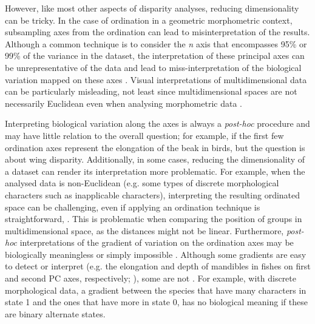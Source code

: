 \documentclass[12pt,letterpaper]{article}
\begin{document}
However, like most other aspects of disparity analyses, reducing dimensionality can be tricky.
In the case of ordination in a geometric morphometric context, subsampling axes from the ordination can lead to misinterpretation of the results. 
Although a common technique is to consider the \textit{n} axis that encompasses 95\% or 99\% of the variance in the dataset, the interpretation of these principal axes can be unrepresentative of the data and lead to miss-interpretation of the biological variation mapped on these axes \citep{Bookstein2015-yy, Bookstein2017-qk, Bookstein2017-gu,Weisbecker2019-kp}.
Visual interpretations of multidimensional data can be particularly misleading, not least since multidimensional spaces are not necessarily Euclidean even when analysing morphometric data \citep{Deline2018-le, Gerber2017-xi}.

Interpreting biological variation along the axes is always a \textit{post-hoc} procedure and may have little relation to the overall question; for example, if the first few ordination axes represent the elongation of the beak in birds, but the question is about wing disparity.
Additionally, in some cases, reducing the dimensionality of a dataset can render its interpretation more problematic.
For example, when the analysed data is non-Euclidean (e.g. some types of discrete morphological characters such as inapplicable characters), interpreting the resulting ordinated space can be challenging, even if applying an ordination technique is straightforward, \citep{Gerber2019}.
This is problematic when comparing the position of groups in multidimensional space, as the distances might not be linear.
Furthermore, \textit{post-hoc} interpretations of the gradient of variation on the ordination axes may be biologically meaningless or simply impossible \citep{Gerber2019}.
Although some gradients are easy to detect or interpret (e.g. the elongation and depth of mandibles in fishes on first and second PC axes, respectively; \citealt{Hill2018-ye}), some are not \citep[e.g.][]{Weisbecker2019-kp}.
For example, with discrete morphological data, a gradient between the species that have many characters in state 1 and the ones that have more in state 0, has no biological meaning if these are binary alternate states.
\end{document}
